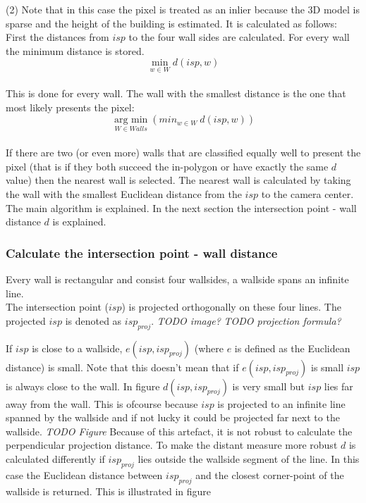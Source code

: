\documentclass[10pt]{article}
\newcommand{\argmin}[1]{\underset{#1}{\operatorname{arg\ min}}}
\begin{document}
(2) Note that in this case the pixel is treated as an inlier because the 3D
model is sparse and the height of the building is estimated. It is 
calculated as follows: \\
First the distances from $isp$ to the four wall sides are calculated.
For every wall the minimum distance is stored.\\
$$\min_{w\in W} d(isp, w)$$\\
This is done for every wall. The wall with the smallest distance is the one that
most likely presents the pixel:\\
$$\argmin{W \in Walls} ( min_{w\in W}\ d(isp, w) )$$\\


If there are two (or even more) walls that are classified equally well to
present the pixel (that is if they both succeed the in-polygon or have exactly the
same $d$ value) then the nearest wall is selected. The nearest wall is
calculated by taking the wall with the smallest Euclidean distance from the $isp$ to the
camera center.
The main algorithm is explained. In the next section the intersection point -
wall distance $d$ is explained.

\subsubsection{Calculate the intersection point - wall distance}
Every wall is rectangular and consist four wallsides, a wallside spans an
infinite line.\\
The intersection point ($isp$) is projected orthogonally on these four lines.
The projected $isp$ is denoted as $isp_{proj}$.
\textit{ TODO image?}
\textit{ TODO projection formula?}

If $isp$ is close to a wallside, $e(isp, isp_{proj})$ (where $e$ is defined as
the Euclidean distance) is small.  Note that this doesn't mean that if
$e(isp,isp_{proj})$ is small $isp$ is always close to the wall. 
In figure $d(isp, isp_{proj})$ is very small but $isp$ lies far away from the
wall.  This is ofcourse because $isp$ is projected to an infinite line spanned
by the wallside and if not lucky it could be projected far next to the wallside.
\textit{ TODO Figure}
Because of this artefact, it is not robust to calculate the perpendicular
projection distance.  To make the distant measure more robust $d$ is calculated
differently if $isp_{proj}$ lies outside the wallside segment of the line. In
this case the Euclidean distance between $isp_{proj}$ and the closest
corner-point of the wallside is returned.
This is illustrated in figure
\end{document}
